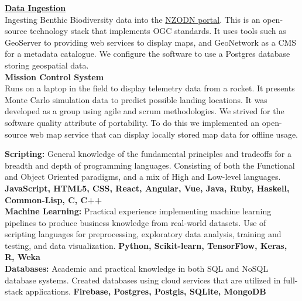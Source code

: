 \documentclass[9pt]{developercv}
\begin{document}
\textbf{\href{https://github.com/woodRock/psychic-invention}{Data Ingestion}} \\
Ingesting Benthic Biodiversity data into the \href{https://nzodn.nz/}{NZODN portal}. This is an open-source technology stack that implements OGC standards. It uses tools such as GeoServer to providing web services to display maps, and GeoNetwork as a CMS for a metadata catalogue. We configure the software to use a Postgres database storing geospatial data. \\

\textbf{Mission Control System} \\
Runs on a laptop in the field to display telemetry data from a rocket. It presents Monte Carlo simulation data to predict possible landing locations. It was developed as a group using agile and scrum methodologies. We strived for the software quality attribute of portability. To do this we implemented an open-source web map service that can display locally stored map data for offline usage.



\textbf{Scripting:} General knowledge of the fundamental principles and tradeoffs for a breadth and depth of programming languages. Consisting of both the Functional and Object Oriented paradigms, and a mix of High and Low-level languages. \textbf{JavaScript, HTML5, CSS, React, Angular, Vue, Java, Ruby, Haskell, Common-Lisp, C, C++} \\

\textbf{Machine Learning:} Practical experience implementing machine learning pipelines to produce business knowledge from real-world datasets. Use of scripting languages for preprocessing, exploratory data analysis, training and testing, and data visualization. \textbf{Python, Scikit-learn, TensorFlow, Keras, R, Weka} \\

\textbf{Databases:} Academic and practical knowledge in both SQL and NoSQL database systems. Created databases using cloud services that are utilized in full-stack applications. \textbf{Firebase, Postgres, Postgis, SQLite, MongoDB} \\
\end{document}

